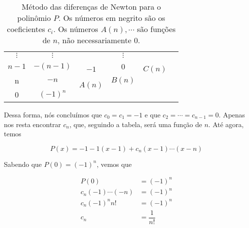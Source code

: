 \documentclass{article}
\begin{document}
\begin{enumerate}
\begin{table}[!h]
\begin{tabular}{c|c|c|c|c|l}
                    \\
                    $\vdots$ &
                    $\vdots$ &
                    &
                    $\vdots$ &
                    &
                    \\
                    \multirow{2}{*}{$n-1$} &
                    \multirow{2}{*}{$-(n-1)$} &
                    &
                    \multirow{2}{*}{0} &
                    &
                    \\
                    &
                    &
                    \multirow{2}{*}{$-1$} &
                    &
                    \multirow{2}{*}{$C(n)$} &
                    \\
                    \multirow{2}{*}{n} &
                    \multirow{2}{*}{$-n$} &
                    &
                    \multirow{2}{*}{$B(n)$} &
                    &
                    \\
                    &
                    &
                    \multirow{2}{*}{$A(n)$} &
                    &
                    &
                    \\
                    \multirow{2}{*}{0} &
                    \multirow{2}{*}{$(-1)^n$} &
                    &
                    &
                    &
                    \\
                    &
                    &
                    &
                    &
                    &
                
                \end{tabular}
                \caption{Método das diferenças de Newton para o polinômio $P$.
                Os números em negrito são os coeficientes $c_i$.
                Os números $A(n), \cdots$ são funções de $n$, não necessariamente $0$.}
                \label{tab:diff}
            \end{table}

            Dessa forma, nós concluímos que $c_0 = c_1 = -1$ e que
            $c_2 = \cdots = c_{n-1} = 0$.
            Apenas nos resta encontrar $c_n$, que, seguindo a tabela,
            será uma função de $n$. Até agora, temos
            
            $$P(x) = -1 -1(x-1) + c_n(x-1)\cdots(x-n)$$

            Sabendo que $P(0) = (-1)^n$, vemos que

            \begin{align*}
                P(0) &= (-1)^n \\
                c_n(-1)\cdots(-n) &= (-1)^n \\
                c_n(-1)^n n! &= (-1)^n \\
                c_n &= \dfrac{1}{n!} \\
            \end{align*}


\end{enumerate}
\end{document}
